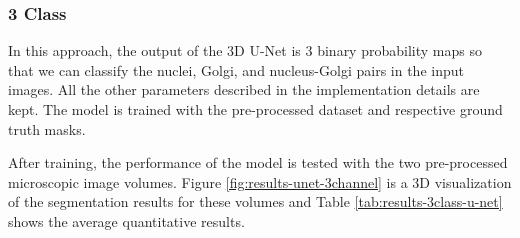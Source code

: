 \subsubsection*{3 Class}

In this approach, the output of the \ac{3D} U-Net is 3 binary probability maps so that we can classify the nuclei, Golgi, and nucleus-Golgi pairs in the input images. All the other parameters described in the implementation details are kept. The model is trained with the pre-processed dataset and respective ground truth masks.

After training, the performance of the model is tested with the two pre-processed microscopic image volumes. Figure \ref{fig:results-unet-3channel} is a \ac{3D} visualization of the segmentation results for these volumes and Table \ref{tab:results-3class-u-net} shows the average quantitative results.


